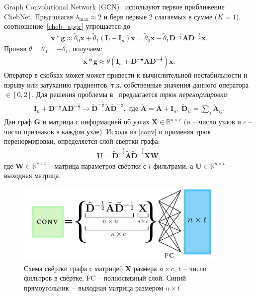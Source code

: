 \documentclass[14pt]{extarticle}
\begin{document}
Graph Convolutional Network (GCN)~\cite{kipf_semi-supervised_2017} используют первое приближение ChebNet. Предполагая $\lambda_{\max} \approx 2$ и беря первые 2 слагаемых в сумме ($K=1$), соотношение~\eqref{cheb_appr} упрощается до 
\begin{align}
\mathbf{x} * \mathbf{g} \approx \tilde{\theta}_{0} \mathbf{x}+\tilde{\theta}_{1}\left(\mathbf{L}-\mathbf{I}_{n}\right) \mathbf{x}=\tilde{\theta}_{0} \mathbf{x}-\tilde{\theta}_{1} \mathbf{D}^{-\frac{1}{2}} \mathbf{A} \mathbf{D}^{-\frac{1}{2}} \mathbf{x}.
\end{align}
Приняв $\theta = \tilde{\theta}_0  = -\tilde{\theta}_1$, получаем:
\begin{align}
\mathbf{x} * \mathbf{g}  \approx \theta\left(\mathbf{I}_{n}+\mathbf{D}^{-\frac{1}{2}} \mathbf{A} \mathbf{D}^{-\frac{1}{2}}\right) \mathbf{x}.
\label{conv}
\end{align}
Оператор в скобках может может привести к вычислительной нестабильности и взрыву или затуханию градиентов, т.к. собственные значения данного оператора $\in [0,2]$. Для решения проблемы в~\cite{kipf_semi-supervised_2017} предлагается \textit{трюк перенормировки}: 
\begin{align*}
\mathbf{I}_{n}+\mathbf{D}^{-\frac{1}{2}} \mathbf{A} \mathbf{D}^{-\frac{1}{2}} \rightarrow
\tilde{\mathbf{D}}^{-\frac{1}{2}} \tilde{\mathbf{A}}\tilde{\mathbf{D}}^{-\frac{1}{2}}, 
\text{ где }
\tilde{\mathbf{A}}=\mathbf{A}+\mathbf{I}_{n},~ \tilde{\mathbf{D}}_{i i}=\sum_{j} \tilde{\mathbf{A}}_{i j}.
\end{align*}
Дан граф $\mathbf{G}$ и матрица с информацией об узлах $\mathbf{X} \in \mathbb{R}^{n \times c}$ ($n$ -- число узлов и $c$ -- число признаков в каждом узле). Исходя из \eqref{conv} и применяя трюк перенормировки, определяется слой свёртки графа:
\begin{align}
\textbf{U}=\tilde{\mathbf{D}}^{-\frac{1}{2}} \tilde{\mathbf{A}}\tilde{\mathbf{D}}^{-\frac{1}{2}} \mathbf{X} \mathbf{W},
\label{Z_conv}
\end{align}
где $\mathbf{W} \in \mathbb{R}^{c \times t}$ – матрица параметров свёртки с $t$ фильтрами, а $\textbf{U} \in \mathbb{R}^{n \times t}$~-- выходная матрица.
\begin{figure}[h]
	\centering
	\includegraphics[width=0.9\textwidth]{conv_layer.pdf}
	\caption{Схема свёртки графа с матрицей $\textbf{X}$ размера $n\times c$, $\text{t}$ -- число фильтров в свёртке, FC -- полносвязный слой. Синий прямоугольник~-- выходная матрица размером $n\times t$}
	\label{fig:convlayer}
\end{figure}
\end{document}
